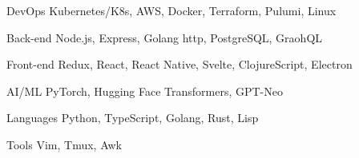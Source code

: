 

\begin{cvskills}

  \cvskill
    {DevOps} %
    {Kubernetes/K8s, AWS, Docker, Terraform, Pulumi, Linux} %

  \cvskill
    {Back-end} %
    {Node.js, Express, Golang http, PostgreSQL, GraohQL} %

  \cvskill
    {Front-end} %
    {Redux, React, React Native, Svelte, ClojureScript, Electron} %

  \cvskill
    {AI/ML} %
    {PyTorch, Hugging Face Transformers, GPT-Neo} %

  \cvskill
    {Languages} %
    {Python, TypeScript, Golang, Rust, Lisp} %

  \cvskill
    {Tools} %
    {Vim, Tmux, Awk} %


\end{cvskills}
